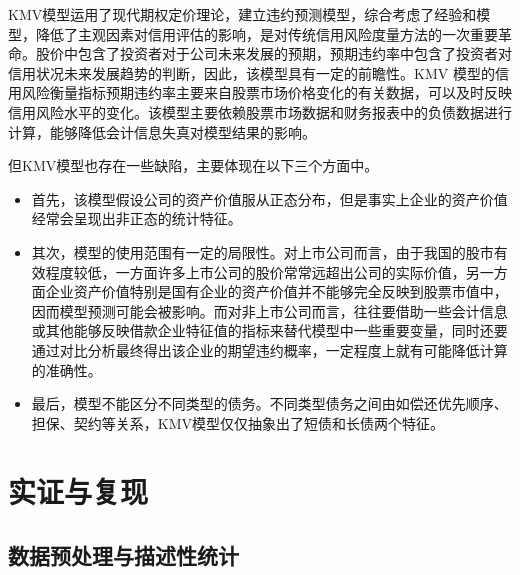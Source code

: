 \documentclass[a4paper,12pt]{ctexart}
\begin{document}
KMV模型运用了现代期权定价理论，建立违约预测模型，综合考虑了经验和模型，降低了主观因素对信用评估的影响，是对传统信用风险度量方法的一次重要革命。股价中包含了投资者对于公司未来发展的预期，预期违约率中包含了投资者对信用状况未来发展趋势的判断，因此，该模型具有一定的前瞻性。KMV 模型的信用风险衡量指标预期违约率主要来自股票市场价格变化的有关数据，可以及时反映信用风险水平的变化。该模型主要依赖股票市场数据和财务报表中的负债数据进行计算，能够降低会计信息失真对模型结果的影响。

但KMV模型也存在一些缺陷，主要体现在以下三个方面中。
\begin{itemize}
    \item 首先，该模型假设公司的资产价值服从正态分布，但是事实上企业的资产价值经常会呈现出非正态的统计特征。
    \item 其次，模型的使用范围有一定的局限性。对上市公司而言，由于我国的股市有效程度较低，一方面许多上市公司的股价常常远超出公司的实际价值，另一方面企业资产价值特别是国有企业的资产价值并不能够完全反映到股票市值中，因而模型预测可能会被影响。而对非上市公司而言，往往要借助一些会计信息或其他能够反映借款企业特征值的指标来替代模型中一些重要变量，同时还要通过对比分析最终得出该企业的期望违约概率，一定程度上就有可能降低计算的准确性。
    \item 最后，模型不能区分不同类型的债务。不同类型债务之间由如偿还优先顺序、担保、契约等关系，KMV模型仅仅抽象出了短债和长债两个特征。
\end{itemize}

\section{实证与复现}

\subsection{数据预处理与描述性统计}
\end{document}
